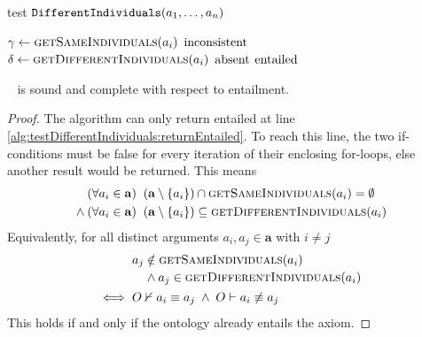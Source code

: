 \documentclass[paper.tex]{subfiles}
\begin{document}

\begin{algorithm}[H]
  \caption{test $\mathtt{DifferentIndividuals}(a_1, \ldots, a_n)$}
  \begin{algorithmic}[1]
    \raggedright
        \State $\gamma \gets \Call{getSameIndividuals}{a_i}$
          \State \Return $\mathrm{inconsistent}$
          \label{alg:testDifferentIndividuals:returnInconsistent}
        \EndIf
      \EndFor
        \State $\delta \gets \Call{getDifferentIndividuals}{a_i}$
          \State \Return $\mathrm{absent}$
        \EndIf
      \EndFor
      \State \Return $\mathrm{entailed}$
      \label{alg:testDifferentIndividuals:returnEntailed}
    \EndFunction
  \end{algorithmic}
\end{algorithm}

\begin{proposition}
  \sloppy~
   is sound and complete with respect to entailment.
\end{proposition}
\begin{proof}
  The algorithm can only return entailed at line \ref{alg:testDifferentIndividuals:returnEntailed}.  To reach this line, the two if-conditions must be false for every iteration of their enclosing for-loops, else another result would be returned.  This means
  \begin{align*}
    & (\forall a_i \in \mathbf{a}) \;\; (\mathbf{a} \setminus \{a_i\}) \intersect \Call{getSameIndividuals}{a_i} = \emptyset \\
    {}\land{}& (\forall a_i \in \mathbf{a}) \;\; (\mathbf{a} \setminus \{a_i\}) \subseteq \Call{getDifferentIndividuals}{a_i}
  \end{align*}
  Equivalently, for all distinct arguments $a_i, a_j \in \mathbf{a}$ with $i \ne j$
  \begin{align*}
    & \begin{multlined}[t]
      a_j \notin \Call{getSameIndividuals}{a_i} \\
      {} \land a_j \in \Call{getDifferentIndividuals}{a_i}
    \end{multlined} \\
    \iff{}& O \nsementails a_i \equiv a_j \;\land\; O \sementails a_i \not\equiv a_j
  \end{align*}
  This holds if and only if the ontology already entails the axiom.
\end{proof}
\end{document}
